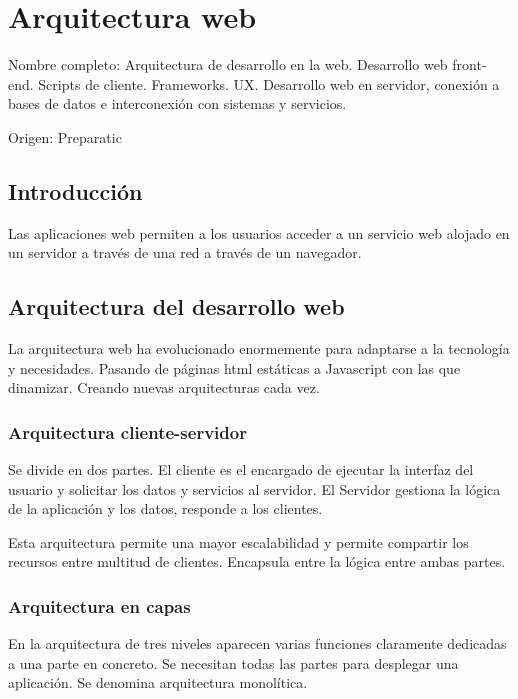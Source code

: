 \setcounter{section}{64} %
\section{Arquitectura web}

Nombre completo: Arquitectura de desarrollo en la web. Desarrollo web front-end. Scripts de cliente. Frameworks. UX. Desarrollo web en servidor, conexión a bases de datos e interconexión con sistemas y servicios.

Origen: Preparatic

\localtableofcontents

\subsection{Introducción}

    Las aplicaciones web permiten a los usuarios acceder a un servicio web alojado en un servidor a través de una red a través de un navegador. 

\subsection{Arquitectura del desarrollo web}

    La arquitectura web ha evolucionado enormemente para adaptarse a la tecnología y necesidades. Pasando de páginas html estáticas a Javascript con las que dinamizar. Creando nuevas arquitecturas cada vez.

    \subsubsection{Arquitectura cliente-servidor}

        Se divide en dos partes. El cliente es el encargado de ejecutar la interfaz del usuario y solicitar los datos y servicios al servidor. El Servidor gestiona la lógica de la aplicación y los datos, responde a los clientes.

        Esta arquitectura permite una mayor escalabilidad y permite compartir los recursos entre multitud de clientes. Encapsula entre la lógica entre ambas partes.

    \subsubsection{Arquitectura en capas}

        En la arquitectura de tres niveles aparecen varias funciones claramente dedicadas a una parte en concreto. Se necesitan todas las partes para desplegar una aplicación. Se denomina arquitectura monolítica.

